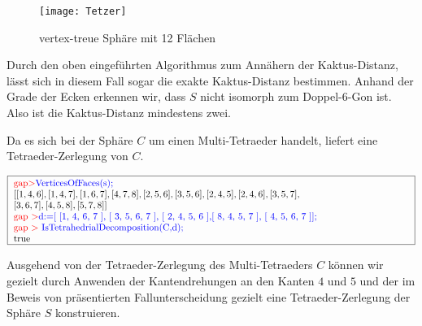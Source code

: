 \documentclass[12pt,titlepage,twoside,cleardoublepage]{article}
\theoremstyle{nummermitklammern}
\numberwithin{equation}{section}
\begin{document}
 \begin{figure}[H]
\begin{center}
\texttt{[image: Tetzer]}
\end{center}
\caption{vertex-treue Sphäre mit 12 Flächen}
\end{figure}
Durch den oben eingeführten Algorithmus zum Annähern der Kaktus-Distanz, lässt sich in diesem Fall sogar die exakte Kaktus-Distanz bestimmen. Anhand der Grade der Ecken erkennen wir, dass $S$ nicht isomorph zum Doppel-6-Gon ist. Also ist die Kaktus-Distanz mindestens zwei.
\begin{center}
 \end{center}
Da es sich bei der Sphäre $C$ um einen Multi-Tetraeder handelt, liefert  eine Tetraeder-Zerlegung von $C.$
\begin{center}
 $\fbox{
\parbox{15cm}{
\textcolor{red}{gap$>$}\textcolor{blue}{ VerticesOfFaces(s);}\newline 
$[ [ 1, 4, 6 ], [ 1, 4, 7 ], [ 1, 6, 7 ], [ 4, 7, 8 ], [ 2, 5, 6 ],
[ 3, 5, 6 ],[ 2, 4, 5 ], [ 2, 4, 6 ], [ 3, 5, 7 ],$ \newline
$  [ 3, 6, 7 ],
[ 4, 5, 8 ], [ 5, 7, 8 ] ]$\newline
\textcolor{red}{gap $>$}\textcolor{blue}{d:=[ [1, 4, 6, 7 ], [ 3, 5, 6, 7 ], [ 2, 4, 5, 6 ],[ 8, 4, 5, 7 ], [ 4, 5, 6, 7 ]];}\newline
\textcolor{red}{gap $>$} \textcolor{blue}{IsTetrahedrialDecomposition(C,d);}\newline
true
 }}$
 \end{center}
 Ausgehend von der Tetraeder-Zerlegung des Multi-Tetraeders $C$ können wir gezielt durch Anwenden der Kantendrehungen an den Kanten $4$ und $5$ und der im Beweis von  präsentierten Fallunterscheidung gezielt eine Tetraeder-Zerlegung der Sphäre $S$ konstruieren.
\end{document}
